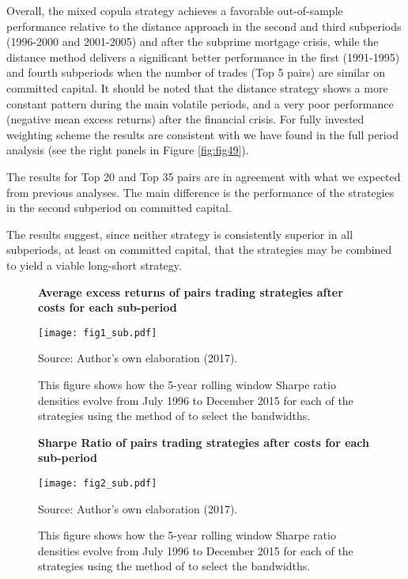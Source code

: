 \documentclass[a4paper,12pt]{report}
\begin{document}
\begin{refsection}
Overall, the mixed copula strategy achieves a favorable out-of-sample performance relative to the distance approach in the second and third subperiods (1996-2000 and 2001-2005) and after the subprime mortgage crisis, while the distance method delivers a significant better performance in the first (1991-1995) and fourth subperiods when the number of trades (Top 5 pairs) are similar on committed capital. It should be noted that the distance strategy shows a more constant pattern during the main volatile periods, and a very poor performance (negative mean excess returns) after the financial crisis. For fully invested weighting scheme the results are consistent with we have found in the full period analysis (see the right panels in Figure \ref{fig:fig49}).

The results for Top 20 and Top 35 pairs are in agreement with what we expected from previous analyses. The main difference is the performance of the strategies in the second subperiod on committed capital.

The results suggest, since neither strategy is consistently superior in all subperiods, at least on committed capital, that the strategies may be combined to yield a viable long-short strategy.

\begin{figure}[H]
	\centering
	\caption{\textbf{Average excess returns of pairs trading strategies after costs for each sub-period}}
	\texttt{[image: fig1\_sub.pdf]}
	\captionsetup{justification=raggedright,
		singlelinecheck=false
	}
	\caption*{Source: Author's own elaboration (2017).}
	\caption*{\scriptsize This figure shows how the 5-year rolling window Sharpe ratio densities evolve from July 1996 to December 2015 for each of the strategies using the method of \citet*{sj1991} to select the bandwidths.}
	\label{fig:fig6}
\end{figure}

\begin{figure}[H]
	\centering
	\caption{\textbf{Sharpe Ratio of pairs trading strategies after costs for each sub-period}}
	\texttt{[image: fig2\_sub.pdf]}
	\captionsetup{justification=raggedright,
		singlelinecheck=false
	}
	\caption*{Source: Author's own elaboration (2017).}
	\caption*{\scriptsize This figure shows how the 5-year rolling window Sharpe ratio densities evolve from July 1996 to December 2015 for each of the strategies using the method of \citet*{sj1991} to select the bandwidths.}
	\label{fig:fig7}
\end{figure}


\end{refsection}
\end{document}
